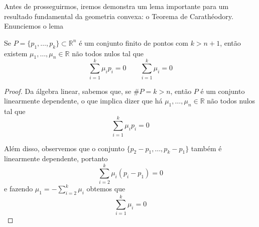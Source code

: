 Antes de prosseguirmos, iremos demonstra um lema importante para um
resultado fundamental da geometria convexa: o Teorema de Carathéodory.
Enunciemos o lema

\begin{lemma:afim}
	\label{lemma:afim}
	Se $P = \{p_1, \ldots, p_k\} \subset \mathbb{R}^n$ é um conjunto
	finito de pontos com $k > n + 1$, então existem $\mu_1, \ldots, \mu_n
	\in \mathbb{R}$ não todos nulos tal que
	\begin{equation*}
		\displaystyle\sum_{i=1}^k \mu_i p_i = 0 \quad\quad \displaystyle\sum_{i=1}^k \mu_i = 0
	\end{equation*}
	
	\begin{proof}
		Da álgebra linear, sabemos que, se $\#P = k > n$, então $P$ é um conjunto
		linearmente dependente, o que implica dizer que há $\mu_1, \ldots, \mu_n
		\in \mathbb{R}$ não todos nulos tal que
		\[\displaystyle\sum_{i=1}^k \mu_i p_i = 0\]
		
		Além disso, observemos que o conjunto $\{p_2 - p_1, \ldots, p_k - p_1\}$
		também é linearmente dependente, portanto 
		\[\displaystyle\sum_{i=2}^k \mu_i (p_i - p_1) = 0\]
		e fazendo \(\mu_1 = -\displaystyle\sum_{i=2}^k \mu_i\)
		obtemos que
		\[\displaystyle\sum_{i=1}^k \mu_i = 0\]
	\end{proof}
\end{lemma:afim}

